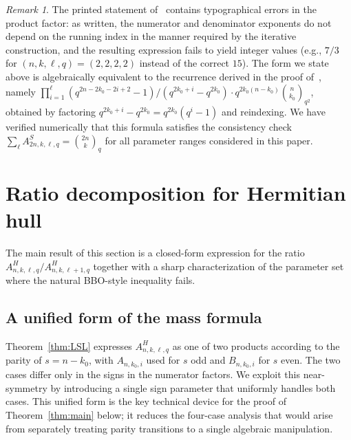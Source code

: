 \documentclass[11pt]{article}
\theoremstyle{plain}
\theoremstyle{remark}
\newtheorem{remark}[theorem]{Remark}
\begin{document}
\begin{remark}
The printed statement of~\cite[Theorem 4.9]{LSL2024} contains typographical
errors in the product factor: as written, the numerator and denominator exponents
do not depend on the running index in the manner required by the iterative
construction, and the resulting expression fails to yield integer values
(e.g., $7/3$ for $(n,k,\ell,q) = (2,2,2,2)$ instead of the correct $15$).
The form we state above is algebraically equivalent to the recurrence derived in
the proof of~\cite[Theorem 4.9]{LSL2024}, namely
$\prod_{i=1}^{\ell} (q^{2n-2k_0-2i+2}-1)/(q^{2k_0+i}-q^{2k_0}) \cdot
q^{2k_0(n-k_0)} \binom{n}{k_0}_{q^2}$,
obtained by factoring $q^{2k_0+i}-q^{2k_0} = q^{2k_0}(q^i-1)$ and reindexing.
We have verified numerically that this formula satisfies the consistency check
$\sum_\ell A^S_{2n,k,\ell,q} = \binom{2n}{k}_q$ for all parameter ranges
considered in this paper.
\end{remark}

\section{Ratio decomposition for Hermitian hull}\label{sec:main}

The main result of this section is a closed-form expression for the ratio
$A^H_{n,k,\ell,q} / A^H_{n,k,\ell+1,q}$ together with a sharp characterization
of the parameter set where the natural BBO-style inequality fails.

\subsection{A unified form of the mass formula}\label{sec:unified}

Theorem~\ref{thm:LSL} expresses $A^H_{n,k,\ell,q}$ as one of two products
according to the parity of $s = n - k_0$, with $A_{n,k_0,i}$ used for $s$ odd
and $B_{n,k_0,i}$ for $s$ even. The two cases differ only in the signs in the
numerator factors. We exploit this near-symmetry by introducing a single
sign parameter that uniformly handles both cases. This unified form is the
key technical device for the proof of Theorem~\ref{thm:main} below; it
reduces the four-case analysis that would arise from separately treating
parity transitions to a single algebraic manipulation.
\end{document}

